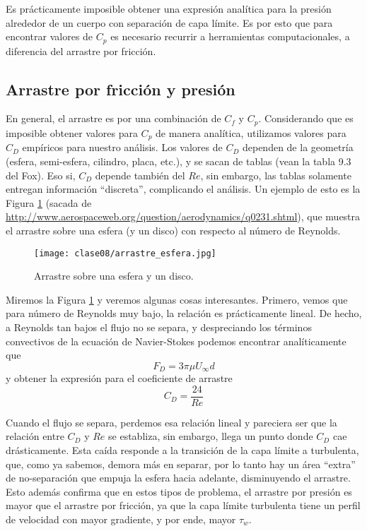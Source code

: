 Es prácticamente imposible obtener una expresión analítica para la presión alrededor de un cuerpo con separación de capa límite. 
Es por esto que para encontrar valores de $C_p$ es necesario recurrir a herramientas computacionales, a diferencia del arrastre por fricción.

\subsection*{Arrastre por fricción y presión}

En general, el arrastre es por una combinación de $C_f$ y $C_p$.
Considerando que es imposible obtener valores para $C_p$ de manera analítica, utilizamos valores para $C_D$ empíricos para nuestro análisis.
Los valores de $C_D$ dependen de la geometría (esfera, semi-esfera, cilindro, placa, etc.), y se sacan de tablas (vean la tabla 9.3 del Fox).
Eso si, $C_D$ depende también del $Re$, sin embargo, las tablas solamente entregan información ``discreta'', complicando el análisis.
Un ejemplo de esto es la Figura \ref{fig:arrastre_esfera} (sacada de \url{http://www.aerospaceweb.org/question/aerodynamics/q0231.shtml}), que muestra el arrastre sobre una esfera (y un disco) con respecto al número de Reynolds.
%
\begin{figure}
\centering
\texttt{[image: clase08/arrastre\_esfera.jpg]}
\caption{Arrastre sobre una esfera y un disco.}
\label{fig:arrastre_esfera}
\end{figure}

Miremos la Figura \ref{fig:arrastre_esfera} y veremos algunas cosas interesantes.
Primero, vemos que para número de Reynolds muy bajo, la relación es prácticamente lineal.
De hecho, a Reynolds tan bajos el flujo no se separa, y despreciando los términos convectivos de la ecuación de Navier-Stokes podemos encontrar analíticamente que
%
\begin{equation}
F_D = 3\pi\mu U_\infty d
\end{equation}
%
y obtener la expresión para el coeficiente de arrastre 
%
\begin{equation}
C_D = \frac{24}{Re}
\end{equation}

Cuando el flujo se separa, perdemos esa relación lineal y pareciera ser que la relación entre $C_D$ y $Re$ se establiza, sin embargo, llega un punto donde $C_D$ cae drásticamente. 
Esta caída responde a la transición de la capa límite a turbulenta, que, como ya sabemos, demora más en separar, por lo tanto hay un área ``extra'' de no-separación que empuja la esfera hacia adelante, disminuyendo el arrastre.
Esto además confirma que en estos tipos de problema, el arrastre por presión es mayor que el arrastre por fricción, ya que la capa límite turbulenta tiene un perfil de velocidad con mayor gradiente, y por ende, mayor $\tau_w$.

